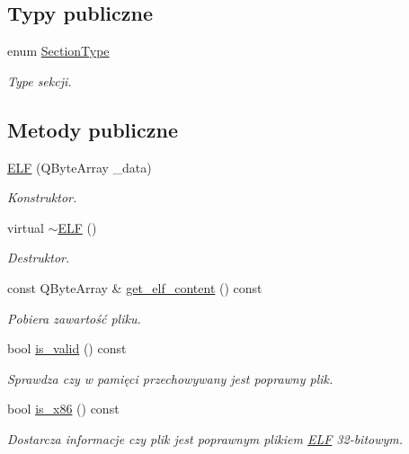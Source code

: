 \subsection*{Typy publiczne}
\begin{DoxyCompactItemize}
\item 
enum \hyperlink{class_e_l_f_abaebdfb7048441e430684d68df8d73d1}{Section\-Type} 
\begin{DoxyCompactList}\small\item\em Type sekcji. \end{DoxyCompactList}\end{DoxyCompactItemize}
\subsection*{Metody publiczne}
\begin{DoxyCompactItemize}
\item 
\hyperlink{class_e_l_f_a7bcefdc63dcaee056a3800f57cf73992}{E\-L\-F} (Q\-Byte\-Array \-\_\-data)
\begin{DoxyCompactList}\small\item\em Konstruktor. \end{DoxyCompactList}\item 
virtual \hyperlink{class_e_l_f_a8d420911533a8753e9936cb5c9238747}{$\sim$\-E\-L\-F} ()
\begin{DoxyCompactList}\small\item\em Destruktor. \end{DoxyCompactList}\item 
const Q\-Byte\-Array \& \hyperlink{class_e_l_f_ad2f8a0a47d56ee33a9234c9415414e00}{get\-\_\-elf\-\_\-content} () const 
\begin{DoxyCompactList}\small\item\em Pobiera zawartość pliku. \end{DoxyCompactList}\item 
bool \hyperlink{class_e_l_f_aaf0da9f62b61fc3674b7fd54d9885b5f}{is\-\_\-valid} () const 
\begin{DoxyCompactList}\small\item\em Sprawdza czy w pamięci przechowywany jest poprawny plik. \end{DoxyCompactList}\item 
bool \hyperlink{class_e_l_f_ac5c89b2b437f3e07aedc06f66cdab94d}{is\-\_\-x86} () const 
\begin{DoxyCompactList}\small\item\em Dostarcza informacje czy plik jest poprawnym plikiem \hyperlink{class_e_l_f}{E\-L\-F} 32-\/bitowym. \end{DoxyCompactList}\item 

\end{DoxyCompactItemize}
